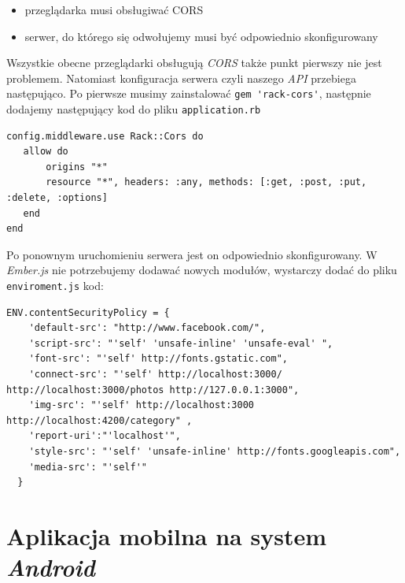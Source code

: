 \documentclass[openright]{xmgr}
\begin{document}
\begin{itemize}
\item przeglądarka musi obsługiwać CORS
\item serwer, do którego się odwołujemy musi być odpowiednio skonfigurowany
\end{itemize}
 Wszystkie obecne przeglądarki obsługują \textit{CORS} także punkt pierwszy nie jest problemem. Natomiast konfiguracja serwera czyli naszego \textit{API} przebiega następująco. Po pierwsze musimy zainstalować \verb|gem 'rack-cors'|, następnie dodajemy następujący kod do pliku \verb|application.rb|
\begin{verbatim}
config.middleware.use Rack::Cors do
   allow do
       origins "*"
       resource "*", headers: :any, methods: [:get, :post, :put, :delete, :options]
   end
end
\end{verbatim}
Po ponownym uruchomieniu serwera jest on odpowiednio skonfigurowany.
\newline\indent W \textit{Ember.js} nie potrzebujemy dodawać nowych modułów, wystarczy dodać do pliku \verb|enviroment.js| kod:
\begin{verbatim}
ENV.contentSecurityPolicy = {
    'default-src': "http://www.facebook.com/",
    'script-src': "'self' 'unsafe-inline' 'unsafe-eval' ",
    'font-src': "'self' http://fonts.gstatic.com", 
    'connect-src': "'self' http://localhost:3000/ http://localhost:3000/photos http://127.0.0.1:3000",
    'img-src': "'self' http://localhost:3000 http://localhost:4200/category" ,
    'report-uri':"'localhost'",
    'style-src': "'self' 'unsafe-inline' http://fonts.googleapis.com", 
    'media-src': "'self'"
  }
\end{verbatim}
\section{Aplikacja mobilna  na system \textit{Android}}
\end{document}
